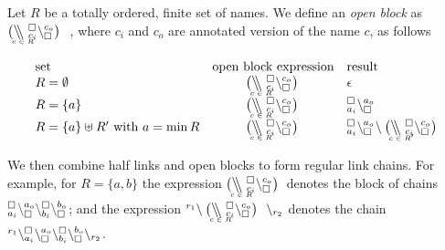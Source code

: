 \begin{definition}\label{def:open}
Let $R$ be a totally ordered, finite set of names. We 
define an \emph{open block} as $\blockchain{c_i}{c_o}{c \in R}$\ , where $c_i$ and $c_o$ are annotated version of the name $c$, as follows

\[
\begin{array}{l@{\quad}c@{\quad}l}
\mbox{set}& \mbox{open block expression}& \mbox{result}\\
R= \emptyset & \blockchain{c_i}{c_o}{c \in R}   &\epsilon\\
R = \{ a\}    &\blockchain{c_i}{c_o}{c \in R}  & {}_{a_i}^{\noact}\chainedlink{\noact}{a_o}\\
R = \{a\} \uplus R' \mbox{ with } a=\min R& \blockchain{c_i}{c_o}{c \in R} & {}_{a_i}^{\noact}\chainedlink{\noact}{a_o}\link{}{}\blockchain{c_i}{c_o}{c \in R'}
\end{array}
\]
\end{definition}

We then combine half links and  open blocks to form regular link chains.
%
 For example, for $R = \{a,b\}$ the expression $ \blockchain{c_i}{c_o}{c \in R} $\;
denotes the block of chains ${}_{a_i}^{\scriptstyle {\square}}\backslash_{\scriptstyle {\square}}^{a_o} \backslash{}_{b_i}^{\scriptstyle {\square}}\backslash_{\scriptstyle {\square}}^{b_o}$; and the expression $\link{r_1}{} \blockchain{c_i}{c_o}{c \in R}\;\link{}{r_2} $ denotes the chain $ {}^{r_1}\backslash_{a_i}^{\scriptstyle {\square}}\backslash_{\scriptstyle {\square}}^{a_o}\backslash_{b_i}^{\scriptstyle {\square}}\backslash_{\scriptstyle {\square}}^{b_o}\backslash_{r_2}$.


